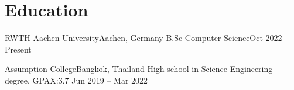 \section{Education}
\resumeSubHeadingListStart
\resumeSubheading
{RWTH Aachen University}{Aachen, Germany}
{B.Sc Computer Science}{Oct 2022 -- Present}
\resumeItemListStart
{}
\resumeItemListEnd

\resumeSubheading
{Assumption College}{Bangkok, Thailand}
{High school in Science-Engineering degree, GPAX:3.7 }{ Jun 2019 -- Mar 2022}
\resumeSubHeadingListEnd
